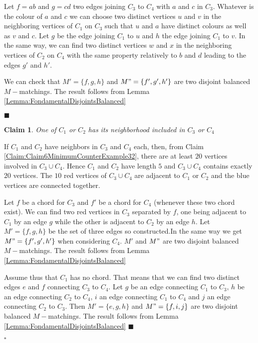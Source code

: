 \documentclass{elsart}
\theoremstyle{plain} \theoremheaderfont{\scshape}
\newtheorem{Clm}{Claim}[Thm]
\newenvironment{Prf}{{\bf \noindent Proof } }{\hfill$\square$\\}
\newenvironment{PrfClaim}{{\bf Proof }}{{\hfill\tiny{$\blacksquare$\\}}}
\begin{document}
\begin{Prf}
\begin{PrfClaim}
Let $f=ab$ and $g=cd$ two edges joining $C_3$ to $C_4$ with $a$ and
$c$ in $C_3$. Whatever is the colour of $a$ and $c$ we can choose
two distinct vertices $u$ and $v$ in the neighboring vertices of
$C_1$ on $C_3$ such that $u$ and $a$ have distinct colours as well
as $v$ and $c$. Let $g$ be the edge joining $C_1$ to $u$ and $h$ the
edge joining $C_1$ to $v$. In the same way, we can find two distinct
vertices $w$ and $x$ in the neighboring vertices of $C_2$ on $C_4$
with the same property relatively to $b$ and $d$ leading to the
edges $g'$ and $h'$.

We can check that $M'=\{f,g,h\}$ and $M"=\{f',g',h'\}$ are two
disjoint balanced $M-$matchings. The result follows from Lemma
\ref{Lemma:FondamentalDisjointsBalanced}

\end{PrfClaim}

\begin{Clm} \label{Claim:Claim10MinimumCounterExample32}
One of $C_1$ or $C_2$ has its neighborhood included in $C_3$ or
$C_4$
\end{Clm}
\begin{PrfClaim}
If $C_1$  and $C_2$ have neighbors in $C_3$ and $C_4$ each, then,
from Claim \ref{Claim:Claim6MinimumCounterExample32}, there are at
least $20$ vertices involved in $C_3 \cup C_4$. Hence $C_1$ and
$C_2$ have length $5$ and $C_3 \cup C_4$ contains exactly $20$
vertices. The $10$ red vertices of $C_3 \cup C_4$ are adjacent to
$C_1$ or $C_2$ and the blue vertices are connected together.

Let $f$ be a chord for $C_3$ and $f'$ be a chord for $C_4$ (whenever
these two chord exist). We can find two red vertices in $C_3$
separated by $f$, one being adjacent to $C_1$ by an edge $g$ while
the other is adjacent to $C_2$ by an edge $h$. Let $M'=\{f,g,h\}$ be
the  set of three edges so constructed.In the same way we get
$M"=\{f',g',h'\}$ when considering $C_4$. $M'$ and $M"$ are two
disjoint balanced $M-$matchings. The result follows from Lemma
\ref{Lemma:FondamentalDisjointsBalanced}

Assume thus that $C_1$ has no chord. That means that we can find two
distinct edges $e$ and $f$ connecting $C_3$ to $C_4$. Let $g$ be an
edge connecting $C_1$ to $C_3$, $h$ be an edge connecting $C_2$ to
$C_4$, $i$ an edge connecting $C_1$ to $C_4$ and $j$ an edge
connecting $C_2$ to $C_3$. Then $M'=\{e,g,h\}$ and $M"=\{f,i,j\}$
are two disjoint balanced $M-$matchings. The result follows from
Lemma \ref{Lemma:FondamentalDisjointsBalanced}
\end{PrfClaim}


\end{Prf}
\end{document}
